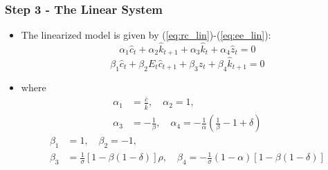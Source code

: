 \documentclass{beamer}
\begin{document}
\begin{frame}
\frametitle{Step 3 - The Linear System}

\begin{itemize}
\item The linearized model is given by (\ref{eq:rc_lin})-(\ref{eq:ee_lin}): 
\begin{equation*}
\alpha_1 \hat c_t + \alpha_2 \hat k_{t+1} + \alpha_3 \hat k_t + \alpha_4 \hat z_t = 0
\end{equation*}
\begin{equation*}
\beta_1 \hat c_t + \beta_2 E_t\hat c_{t+1} + \beta_3 \hat z_t + \beta_4 \hat k_{t+1} = 0
\end{equation*}
\item where
\begin{equation*}
\begin{aligned}
\alpha_1 &= \frac{\bar c}{\bar k},\quad
\alpha_2 = 1,\\
\alpha_3 &= -\frac{1}{\beta},\quad
\alpha_4 = -\frac{1}{\alpha}\left(\frac{1}{\beta}-1+\delta\right)
\end{aligned}
\end{equation*}
\begin{equation*}
\begin{aligned}
\beta_1 &= 1,\quad
\beta_2 = -1,\\
\beta_3 &= \frac{1}{\sigma}\left[1-\beta(1-\delta)\right]\rho,\quad
\beta_4 = -\frac{1}{\sigma}(1-\alpha)\left[1-\beta(1-\delta)\right]
\end{aligned}
\end{equation*}
\end{itemize}

\end{frame}
\end{document}
